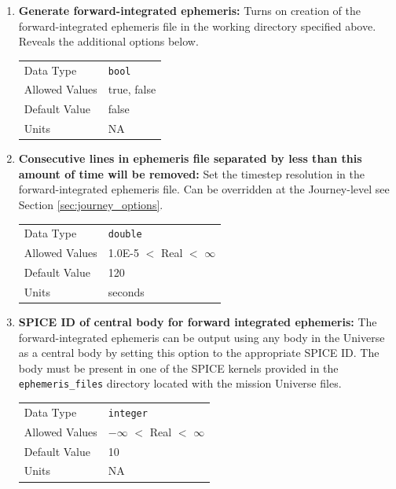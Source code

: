 \begin{enumerate}

\item{\textbf{Generate forward-integrated ephemeris:}} Turns on creation of the forward-integrated ephemeris file in the working directory specified above. Reveals the additional options below.

    \begin{table}[H]
        \hspace{2cm}
        \begin{tabular}{ll}
        Data Type & \verb|bool| \\
        Allowed Values & true, false \\
        Default Value & false \\
        Units & NA
        \end{tabular}
    \end{table}


\item{\textbf{Consecutive lines in ephemeris file separated by less than this amount of time will be removed:}} Set the timestep resolution in the forward-integrated ephemeris file. Can be overridden at the Journey-level see Section \ref{sec:journey_options}.

    \begin{table}[H]
        \hspace{2cm}
        \begin{tabular}{ll}
        Data Type & \verb|double| \\
        Allowed Values & 1.0E-5 $<$ Real $<$ $\infty$ \\
        Default Value & 120 \\
        Units & seconds
        \end{tabular}
    \end{table}

\item{\textbf{\ac{SPICE} ID of central body for forward integrated ephemeris:}} The forward-integrated ephemeris can be output using any body in the Universe as a central body by setting this option to the appropriate \ac{SPICE} ID. The body must be present in one of the \ac{SPICE} kernels provided in the \verb|ephemeris_files| directory located with the mission Universe files.  

    \begin{table}[H]
        \hspace{2cm}
        \begin{tabular}{ll}
        Data Type & \verb|integer| \\
        Allowed Values & $-\infty$ $<$ Real $<$ $\infty$ \\
        Default Value & 10 \\
        Units & NA
        \end{tabular}
    \end{table}


\end{enumerate}
